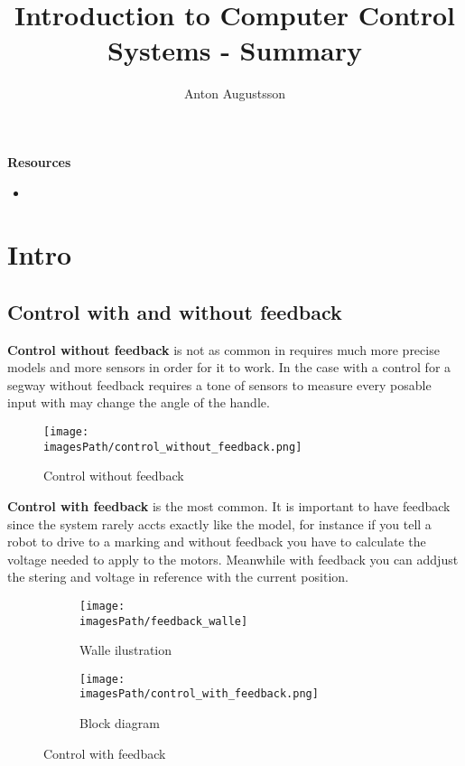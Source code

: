 \documentclass{article}
\title{Introduction to Computer Control Systems - Summary}
\author{Anton Augustsson}
\newcommand{\imagesPath}{images}
\begin{document}
\maketitle
\newpage
\tableofcontents
\newpage


\textbf{Resources}
\begin{itemize}
    \item \url{}
\end{itemize}

\section{Intro}
\subsection{Control with and without feedback}
\textbf{Control without feedback} is not as common in requires much more
precise models and more sensors in order for it to work. In the case with 
a control for a segway without feedback requires a tone of sensors to measure
every posable input with may change the angle of the handle.

\begin{figure}[!h]
    \centering
    \texttt{[image: \\imagesPath/control\_without\_feedback.png]}
    \caption{Control without feedback}
\end{figure}

\textbf{Control with feedback} is the most common. It is important to have feedback 
since the system rarely accts exactly like the model, for instance if you tell a robot
to drive to a marking and without feedback you have to calculate the voltage needed to
apply to the motors. Meanwhile with feedback you can addjust the stering and voltage 
in reference with the current position.
\begin{figure}[!h]
     \centering
     \begin{subfigure}[b]{0.3\textwidth}
         \centering
         \texttt{[image: \\imagesPath/feedback\_walle]}
         \caption{Walle ilustration}
         \label{fig:y equals x}
     \end{subfigure}
     \hfill
     \begin{subfigure}[b]{0.6\textwidth}
         \centering
         \texttt{[image: \\imagesPath/control\_with\_feedback.png]}
         \caption{Block diagram}
         \label{fig:three sin x}
     \end{subfigure}
        \caption{Control with feedback}
        \label{fig:control_with_feedback}
\end{figure}
\end{document}
